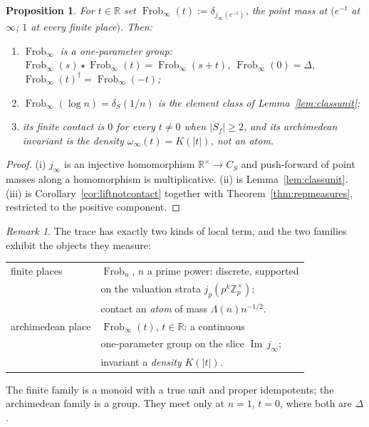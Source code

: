 \documentclass[11pt]{amsart}
\newtheorem{proposition}[theorem]{Proposition}
\theoremstyle{definition}
\theoremstyle{remark}
\newtheorem{remark}[theorem]{Remark}
\newcommand{\R}{\mathbb R}
\newcommand{\Z}{\mathbb Z}
\newcommand{\Iml}{\operatorname{Im}}
\newcommand{\Frob}{\operatorname{Frob}}
\begin{document}
\begin{proposition}\label{prop:archflow}
For $t\in\R$ set $\Frob_\infty(t):=\delta_{j_\infty(e^{-t})}$, the point mass
at $(e^{-t}$ at $\infty$; $1$ at every finite place$)$. Then:
\begin{enumerate}
\item[(i)] $\Frob_\infty$ is a one-parameter \emph{group}:
$\Frob_\infty(s)\star\Frob_\infty(t)=\Frob_\infty(s+t)$,
$\Frob_\infty(0)=\Delta$, $\Frob_\infty(t)^\dagger=\Frob_\infty(-t)$;
\item[(ii)] $\Frob_\infty(\log n)=\delta_S(1/n)$ is the element class of
Lemma~\ref{lem:classunit};
\item[(iii)] its finite contact is $0$ for every $t\ne0$ when $|S_f|\ge2$, and
its archimedean invariant is the \emph{density} $\omega_\infty(t)=K(|t|)$, not
an atom.
\end{enumerate}
\end{proposition}

\begin{proof}
(i) $j_\infty$ is an injective homomorphism $\R^\times\to C_S$ and push-forward
of point masses along a homomorphism is multiplicative. (ii) is
Lemma~\ref{lem:classunit}. (iii) is Corollary~\ref{cor:liftnotcontact} together
with Theorem~\ref{thm:repmeasures}, restricted to the positive component.
\end{proof}

\begin{remark}\label{rem:twoflows}
The trace has exactly two kinds of local term, and the two families exhibit the
objects they measure:
\begin{center}
\begin{tabular}{ll}
\toprule
finite places & $\Frob_n$, $n$ a prime power: discrete, supported\\
 & on the valuation strata $j_p(p^k\Z_p^\times)$;\\
 & contact an \emph{atom} of mass $\Lambda(n)n^{-1/2}$.\\
\midrule
archimedean place & $\Frob_\infty(t)$, $t\in\R$: a continuous\\
 & one-parameter group on the slice $\Iml\,j_\infty$;\\
 & invariant a \emph{density} $K(|t|)$.\\
\bottomrule
\end{tabular}
\end{center}
The finite family is a monoid with a true unit and proper idempotents; the
archimedean family is a group. They meet only at $n=1$, $t=0$, where both are
$\Delta$.
\end{remark}
\end{document}
